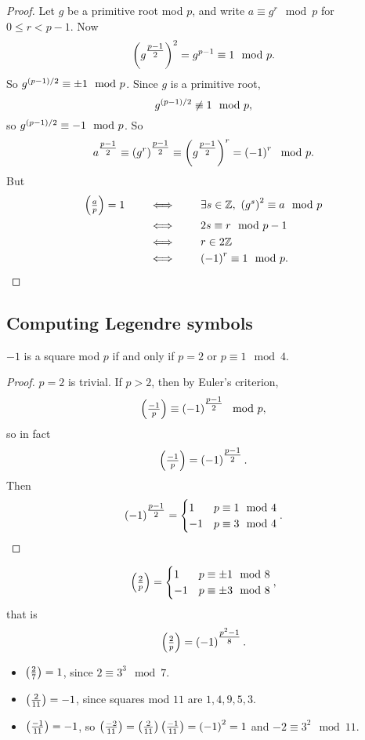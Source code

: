 \begin{proof}
Let $ g $ be a primitive root mod $ p $, and write $ a \equiv g^r \mod p $ for $ 0 \le r < p - 1 $. Now
$$ \left( g^{\tfrac{p - 1}{2}} \right)^2 = g^{p - 1} \equiv 1 \mod p. $$
So $ g^{\left( p - 1 \right) / 2} \equiv \pm 1 \mod p $. Since $ g $ is a primitive root,
$$ g^{\left( p - 1 \right) / 2} \not\equiv 1 \mod p, $$
so $ g^{\left( p - 1 \right) / 2} \equiv -1 \mod p $. So
$$ a^{\tfrac{p - 1}{2}} \equiv \left( g^r \right)^{\tfrac{p - 1}{2}} \equiv \left( g^{\tfrac{p - 1}{2}} \right)^r = \left( -1 \right)^r \mod p. $$
But
\begin{align*}
\left( \tfrac{a}{p} \right) = 1 \qquad
& \iff \qquad \exists s \in \mathbb{Z}, \ \left( g^s \right)^2 \equiv a \mod p \\
& \iff \qquad 2s \equiv r \mod p - 1 \\
& \iff \qquad r \in 2\mathbb{Z} \\
& \iff \qquad \left( -1 \right)^r \equiv 1 \mod p.
\end{align*}
\end{proof}

\subsection{Computing Legendre symbols}

\begin{proposition}
$ -1 $ is a square mod $ p $ if and only if $ p = 2 $ or $ p \equiv 1 \mod 4 $.
\end{proposition}

\begin{proof}
$ p = 2 $ is trivial. If $ p > 2 $, then by Euler's criterion,
$$ \left( \tfrac{-1}{p} \right) \equiv \left( -1 \right)^{\tfrac{p - 1}{2}} \mod p, $$
so in fact
$$ \left( \tfrac{-1}{p} \right) = \left( -1 \right)^{\tfrac{p - 1}{2}}. $$
Then
$$ \left( -1 \right)^{\tfrac{p - 1}{2}} =
\begin{cases}
1 & p \equiv 1 \mod 4 \\
-1 & p \equiv 3 \mod 4
\end{cases}.
$$
\end{proof}

\begin{proposition}
$$ \left( \tfrac{2}{p} \right) =
\begin{cases}
1 & p \equiv \pm 1 \mod 8 \\
-1 & p \equiv \pm 3 \mod 8
\end{cases},
$$
that is
$$ \left( \tfrac{2}{p} \right) = \left( -1 \right)^{\tfrac{p^2 - 1}{8}}. $$
\end{proposition}

\begin{example2}
\hfill
\begin{itemize}
\item $ \left( \tfrac{2}{7} \right) = 1 $, since $ 2 \equiv 3^3 \mod 7 $.
\item $ \left( \tfrac{2}{11} \right) = -1 $, since squares mod $ 11 $ are $ 1, 4, 9, 5, 3 $.
\item $ \left( \tfrac{-1}{11} \right) = -1 $, so $ \left( \tfrac{-2}{11} \right) = \left( \tfrac{2}{11} \right)\left( \tfrac{-1}{11} \right) = \left( -1 \right)^2 = 1 $ and $ -2 \equiv 3^2 \mod 11 $.
\end{itemize}
\end{example2}

